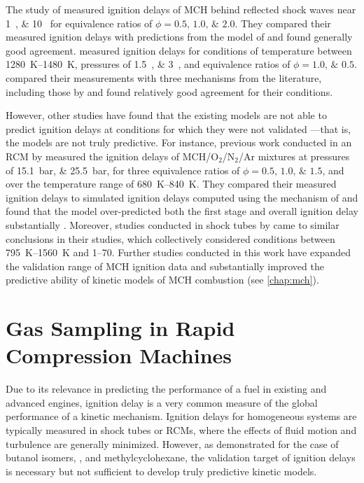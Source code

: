 \documentclass[../main.tex]{subfiles}
\begin{document}
The study of \textcite{Rotavera2013} measured ignition delays of MCH behind
reflected shock waves near \SIlist{1;10}{\atmosphere} for equivalence
ratios of $\phi = \numlist{0.5;1.0;2.0}$. They compared their measured ignition
delays with predictions from the model of \textcite{Pitz2007} and found
generally good agreement. \textcite{Hong2011} measured ignition delays
for conditions of temperature between \SIrange{1280}{1480}{\kelvin}, pressures
of \SIlist{1.5;3}{\atmosphere}, and equivalence ratios of $\phi = \numlist{1.0;0.5}$.
\textcite{Hong2011} compared their measurements with three mechanisms
from the literature, including those by \textcite{Pitz2007, Orme2006}
and found relatively good agreement for their conditions.

However, other studies have found that the existing models are not able
to predict ignition delays at conditions for which they were not validated%
---that is, the models are not truly predictive. For instance, previous work
conducted in an RCM by \textcite{Mittal2009} measured the ignition delays
of MCH/O$_2$/N$_2$/Ar mixtures at pressures of \SIlist{15.1;25.5}{\bar},
for three equivalence ratios of $\phi = \numlist{0.5;1.0;1.5}$, and over
the temperature range of \SIrange{680}{840}{\kelvin}. They compared
their measured ignition delays to simulated ignition delays computed
using the mechanism of \textcite{Pitz2007} and found that the model
over-predicted both the first stage and overall ignition delay substantially
\cite{Mittal2009}. Moreover, studies conducted in shock tubes by
\textcite{Vasu2009, Vanderover2009} came to similar conclusions in their
studies, which collectively considered conditions between \SIrange{795}{1560}{\kelvin}
and \SIrange{1}{70}{\atmosphere}. Further studies conducted in this work
have expanded the validation range of MCH ignition data and substantially
improved the predictive ability of kinetic models of MCH combustion (see
\cref{chap:mch}).

\section{Gas Sampling in Rapid Compression Machines}

Due to its relevance in predicting the performance of a fuel in existing
and advanced engines, ignition delay is a very common measure of the
global performance of a kinetic mechanism. Ignition delays for homogeneous
systems are typically measured in shock tubes or RCMs, where the effects
of fluid motion and turbulence are generally minimized. However, as demonstrated
for the case of butanol isomers, \iPeOH{}, and methylcyclohexane, the
validation target of ignition delays is necessary but not sufficient to
develop truly predictive kinetic models.
\end{document}
